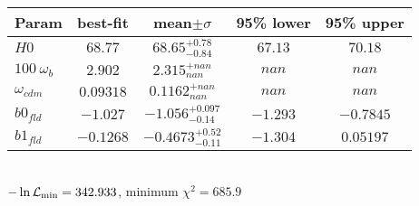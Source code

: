 \begin{tabular}{|l|c|c|c|c|} 
 \hline 
Param & best-fit & mean$\pm\sigma$ & 95\% lower & 95\% upper \\ \hline 
$H0$ &$68.77$ & $68.65_{-0.84}^{+0.78}$ & $67.13$ & $70.18$ \\ 
$100~\omega_{b }$ &$2.902$ & $2.315_{nan}^{+nan}$ & $nan$ & $nan$ \\ 
$\omega_{cdm }$ &$0.09318$ & $0.1162_{nan}^{+nan}$ & $nan$ & $nan$ \\ 
$b0_{fld }$ &$-1.027$ & $-1.056_{-0.14}^{+0.097}$ & $-1.293$ & $-0.7845$ \\ 
$b1_{fld }$ &$-0.1268$ & $-0.4673_{-0.11}^{+0.52}$ & $-1.304$ & $0.05197$ \\ 
\hline 
 \end{tabular} \\ 
$-\ln{\cal L}_\mathrm{min} =342.933$, minimum $\chi^2=685.9$ \\ 
